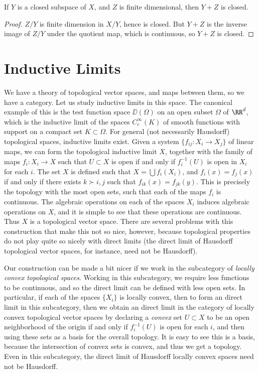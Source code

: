 \begin{corollary}
    If $Y$ is a closed subspace of $X$, and $Z$ is finite dimensional, then $Y + Z$ is closed.
\end{corollary}
\begin{proof}
    $Z/Y$ is finite dimension in $X/Y$, hence is closed. But $Y + Z$ is the inverse image of $Z/Y$ under the quotient map, which is continuous, so $Y + Z$ is closed.
\end{proof}






\section{Inductive Limits}

We have a theory of topological vector spaces, and maps between them, so we have a category. Let us study inductive limits in this space. The canonical example of this is the test function space $\DD(\Omega)$ on an open subset $\Omega$ of $\RR^d$, which is the inductive limit of the spaces $C_c^\infty(K)$ of smooth functions with support on a compact set $K \subset \Omega$. For general (not necessarily Hausdorff) topological spaces, inductive limits exist. Given a system $\{ f_{ij}: X_i \to X_j \}$ of linear maps, we can form the topological inductive limit $X$, together with the family of maps $f_i: X_i \to X$ such that $U \subset X$ is open if and only if $f_i^{-1}(U)$ is open in $X_i$ for each $i$. The set $X$ is defined such that $X = \bigcup f_i(X_i)$, and $f_i(x) = f_j(x)$ if and only if there exists $k \succ i,j$ such that $f_{ik}(x) = f_{jk}(y)$. This is precisely the topology with the most open sets, such that each of the maps $f_i$ is continuous. The algebraic operations on each of the spaces $X_i$ induces algebraic operations on $X$, and it is simple to see that these operations are continuous. Thus $X$ is a topological vector space. There are several problems with this construction that make this not so nice, however, because topological properties do not play quite so nicely with direct limits (the direct limit of Hausdorff topological vector spaces, for instance, need not be Hausdorff).

Our construction can be made a bit nicer if we work in the subcategory of \emph{locally convex topological spaces}. Working in this subcategory, we require less functions to be continuous, and so the direct limit can be defined with less open sets. In particular, if each of the spaces $\{ X_i \}$ is locally convex, then to form an direct limit in this subcategory, then we obtain an direct limit in the category of locally convex topological vector spaces by declaring a \emph{convex} set $U \subset X$ to be an open neighborhood of the origin if and only if $f_i^{-1}(U)$ is open for each $i$, and then using these sets as a basis for the overall topology. It is easy to see this is a basis, because the intersection of convex sets is convex, and thus we get a topology. Even in this subcategory, the direct limit of Hausdorff locally convex spaces need not be Hausdorff.

